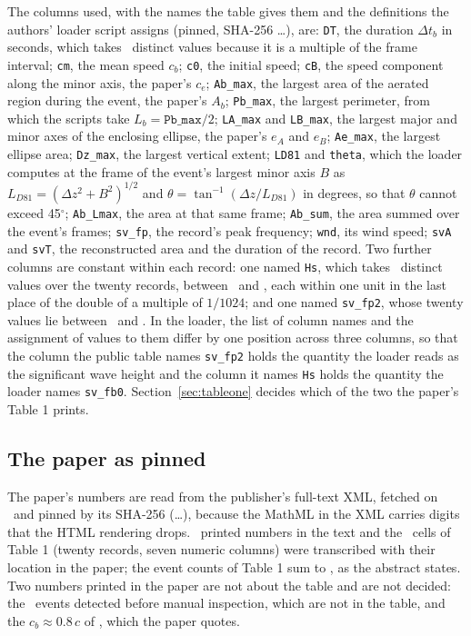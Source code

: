 \documentclass[preprint,11pt,authoryear]{elsarticle}
\begin{document}
The columns used, with the names the table gives them and the definitions the authors' loader script assigns (pinned, SHA-256 \LoaderSha\ldots), are: \texttt{DT}, the duration $\Delta t_b$ in seconds, which takes \DistinctDT\ distinct values because it is a multiple of the frame interval; \texttt{cm}, the mean speed $c_b$; \texttt{c0}, the initial speed; \texttt{cB}, the speed component along the minor axis, the paper's $c_e$; \texttt{Ab\_max}, the largest area of the aerated region during the event, the paper's $A_b$; \texttt{Pb\_max}, the largest perimeter, from which the scripts take $L_b = \texttt{Pb\_max}/2$; \texttt{LA\_max} and \texttt{LB\_max}, the largest major and minor axes of the enclosing ellipse, the paper's $e_A$ and $e_B$; \texttt{Ae\_max}, the largest ellipse area; \texttt{Dz\_max}, the largest vertical extent; \texttt{LD81} and \texttt{theta}, which the loader computes at the frame of the event's largest minor axis $B$ as $L_{D81} = (\Delta z^2 + B^2)^{1/2}$ and $\theta = \tan^{-1}(\Delta z / L_{D81})$ in degrees, so that $\theta$ cannot exceed 45$^\circ$; \texttt{Ab\_Lmax}, the area at that same frame; \texttt{Ab\_sum}, the area summed over the event's frames; \texttt{sv\_fp}, the record's peak frequency; \texttt{wnd}, its wind speed; \texttt{svA} and \texttt{svT}, the reconstructed area and the duration of the record. Two further columns are constant within each record: one named \texttt{Hs}, which takes \HsNamedDistinct\ distinct values over the twenty records, between \HsNamedLo\ and \HsNamedHi, each within one unit in the last place of the double of a multiple of $1/1024$; and one named \texttt{sv\_fp2}, whose twenty values lie between \SvLo\ and \SvHi. In the loader, the list of column names and the assignment of values to them differ by one position across three columns, so that the column the public table names \texttt{sv\_fp2} holds the quantity the loader reads as the significant wave height and the column it names \texttt{Hs} holds the quantity the loader names \texttt{sv\_fb0}. Section~\ref{sec:tableone} decides which of the two the paper's Table 1 prints.

\subsection{The paper as pinned}
The paper's numbers are read from the publisher's full-text XML, fetched on \PaperFetched\ and pinned by its SHA-256 (\XmlSha\ldots), because the MathML in the XML carries digits that the HTML rendering drops. \ItemsTotal\ printed numbers in the text and the \TOneCells\ cells of Table 1 (twenty records, seven numeric columns) were transcribed with their location in the paper; the event counts of Table 1 sum to \NEvents, as the abstract states. Two numbers printed in the paper are not about the table and are not decided: the \InitiallyDetected\ events detected before manual inspection, which are not in the table, and the $c_b \approx 0.8\,c$ of \citet{banner2014prl}, which the paper quotes.
\end{document}
